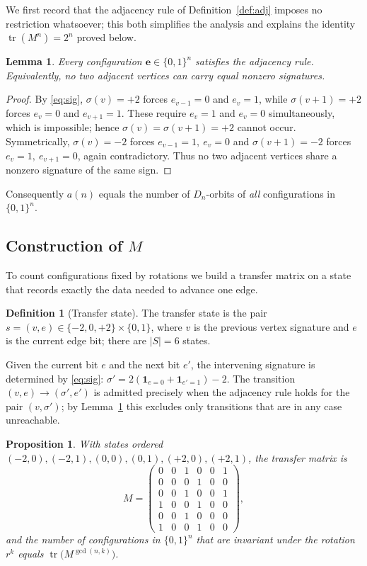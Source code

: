 \documentclass[11pt,a4paper]{article}
\theoremstyle{plain}
\newtheorem{proposition}[theorem]{Proposition}
\newtheorem{lemma}[theorem]{Lemma}
\theoremstyle{definition}
\newtheorem{definition}[theorem]{Definition}
\theoremstyle{remark}
\DeclareMathOperator{\tr}{tr}
\newcommand{\Dih}{D_{n}}
\numberwithin{equation}{section}
\begin{document}
We first record that the adjacency rule of Definition~\ref{def:adj}
imposes no restriction whatsoever; this both simplifies the analysis and
explains the identity $\tr(M^{n})=2^{n}$ proved below.

\begin{lemma}\label{lem:vacuous}
Every configuration $\mathbf e\in\{0,1\}^{n}$ satisfies the adjacency
rule. Equivalently, no two adjacent vertices can carry equal nonzero
signatures.
\end{lemma}

\begin{proof}
By \eqref{eq:sig}, $\sigma(v)=+2$ forces $e_{v-1}=0$ and $e_v=1$, while
$\sigma(v+1)=+2$ forces $e_v=0$ and $e_{v+1}=1$. These require
$e_v=1$ and $e_v=0$ simultaneously, which is impossible; hence
$\sigma(v)=\sigma(v+1)=+2$ cannot occur. Symmetrically, $\sigma(v)=-2$
forces $e_{v-1}=1,\ e_v=0$ and $\sigma(v+1)=-2$ forces $e_v=1,\
e_{v+1}=0$, again contradictory. Thus no two adjacent vertices share a
nonzero signature of the same sign.
\end{proof}

Consequently $a(n)$ equals the number of $\Dih$-orbits of \emph{all}
configurations in $\{0,1\}^{n}$.

\subsection{Construction of $M$}

To count configurations fixed by rotations we build a transfer matrix on
a state that records exactly the data needed to advance one edge.

\begin{definition}[Transfer state]\label{def:state}
The transfer state is the pair $s=(v,e)\in\{-2,0,+2\}\times\{0,1\}$, where
$v$ is the previous vertex signature and $e$ is the current edge bit;
there are $|S|=6$ states.
\end{definition}

Given the current bit $e$ and the next bit $e'$, the intervening
signature is determined by \eqref{eq:sig}:
$\sigma'=2(\mathbf 1_{e=0}+\mathbf 1_{e'=1})-2$. The transition
$(v,e)\to(\sigma',e')$ is admitted precisely when the adjacency rule holds
for the pair $(v,\sigma')$; by Lemma~\ref{lem:vacuous} this excludes only
transitions that are in any case unreachable.

\begin{proposition}\label{prop:M}
With states ordered $(-2,0),(-2,1),(0,0),(0,1),(+2,0),(+2,1)$, the
transfer matrix is
\begin{equation}\label{eq:M}
M=\begin{pmatrix}
0&0&1&0&0&1\\
0&0&0&1&0&0\\
0&0&1&0&0&1\\
1&0&0&1&0&0\\
0&0&1&0&0&0\\
1&0&0&1&0&0
\end{pmatrix},
\end{equation}
and the number of configurations in $\{0,1\}^{n}$ that are invariant
under the rotation $r^{k}$ equals $\tr\!\bigl(M^{\gcd(n,k)}\bigr)$.
\end{proposition}
\end{document}
